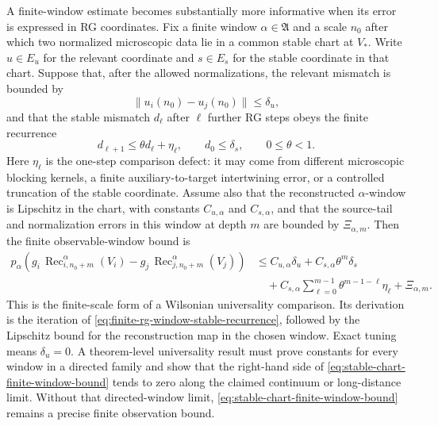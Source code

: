 A finite-window estimate becomes substantially more informative when its
error is expressed in RG coordinates.  Fix a finite window
\(\alpha\in\mathfrak A\) and a scale \(n_0\) after which two normalized
microscopic data lie in a common stable chart at \(V_\ast\).  Write
\(u\in E_u\) for the relevant coordinate and \(s\in E_s\) for the stable
coordinate in that chart.  Suppose that, after the allowed normalizations,
the relevant mismatch is bounded by
\[
  \|u_i(n_0)-u_j(n_0)\|\leq\delta_u ,
\]
and that the stable mismatch \(d_\ell\) after \(\ell\) further RG steps obeys
the finite recurrence
\begin{equation}
  d_{\ell+1}
  \leq
  \theta d_\ell+\eta_\ell,
  \qquad
  d_0\leq\delta_s,\qquad 0\leq\theta<1 .
  \label{eq:finite-rg-window-stable-recurrence}
\end{equation}
Here \(\eta_\ell\) is the one-step comparison defect: it may come from
different microscopic blocking kernels, a finite auxiliary-to-target
intertwining error, or a controlled truncation of the stable coordinate.
Assume also that the reconstructed \(\alpha\)-window is Lipschitz in the
chart, with constants \(C_{u,\alpha}\) and \(C_{s,\alpha}\), and that the
source-tail and normalization errors in this window at depth \(m\) are
bounded by \(\Xi_{\alpha,m}\).  Then the finite observable-window bound is
\begin{equation}
\begin{aligned}
  p_\alpha\!\left(
    g_i\,\operatorname{Rec}_{i,n_0+m}^{\alpha}(V_i)
    -
    g_j\,\operatorname{Rec}_{j,n_0+m}^{\alpha}(V_j)
  \right)
  &\leq
  C_{u,\alpha}\delta_u
  +
  C_{s,\alpha}\theta^m\delta_s                                      \\
  &\quad+
  C_{s,\alpha}\sum_{\ell=0}^{m-1}
    \theta^{m-1-\ell}\eta_\ell
  +
  \Xi_{\alpha,m}.
\end{aligned}
  \label{eq:stable-chart-finite-window-bound}
\end{equation}
This is the finite-scale form of a Wilsonian universality comparison.  Its
derivation is the iteration of
\eqref{eq:finite-rg-window-stable-recurrence}, followed by the Lipschitz
bound for the reconstruction map in the chosen window.  Exact tuning means
\(\delta_u=0\).  A theorem-level universality result must prove constants
for every window in a directed family and show that the right-hand side of
\eqref{eq:stable-chart-finite-window-bound} tends to zero along the
claimed continuum or long-distance limit.  Without that directed-window
limit, \eqref{eq:stable-chart-finite-window-bound} remains a precise
finite observation bound.


